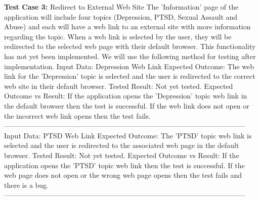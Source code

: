 \documentclass[letterpaper,12pt,titlepage]{article}
\begin{document}
\noindent
\textbf{Test Case 3:} Redirect to External Web Site
\newline
\newline
The 'Information' page of the application will include four topics (Depression, PTSD, Sexual Assault and Abuse) and each will have a web link to an external site with more information regarding the topic. When a web link is selected by the user, they will be redirected to the selected web page with their default browser. This functionality has not yet been implemented. We will use the following method for testing after implementation.
\newline
\newline
Input Data: Depression Web Link
\newline
\newline
Expected Outcome: The web link for the 'Depression' topic is selected and the user is redirected to the correct web site in their default browser.
\newline
\newline
Tested Result: Not yet tested.
\newline
\newline
Expected Outcome vs Result: If the application opens the 'Depression' topic web link in the default browser then the test is successful. If the web link does not open or the incorrect web link opens then the test fails.
\newline
\newline
------------------------------------------------------------------------------------------------------
\newline
Input Data: PTSD Web Link
\newline
\newline
Expected Outcome: The 'PTSD' topic web link is selected and the user is redirected to the associated web page in the default browser.
\newline
\newline
Tested Result: Not yet tested.
\newline
\newline
Expected Outcome vs Result: If the application opens the 'PTSD' topic web link then the test is successful. If the web page does not open or the wrong web page opens then the test fails and there is a bug.
\newline
\newline
------------------------------------------------------------------------------------------------------
\newline
\end{document}
